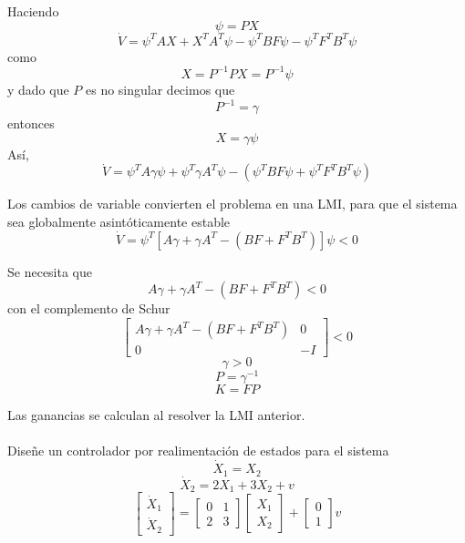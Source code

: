 \begin{flushright}
\end{flushright}

Haciendo
\[
  \psi=PX
\]
\[
  \dot{V}
  =\psi^{T}AX+X^{T}A^{T}\psi
  -\psi^{T}BF\psi-\psi^{T}F^{T}B^{T}\psi
\]
como
\[
  X=P^{-1}PX=P^{-1}\psi
\]
y dado que $P$ es no singular decimos que
\[
  P^{-1}=\gamma
\]
entonces
\[
  X=\gamma\psi
\]
Así,
\[
  \dot{V}
  =\psi^{T}A\gamma\psi+\psi^{T}\gamma A^{T}\psi
  -(\psi^{T}BF\psi+\psi^{T}F^{T}B^{T}\psi)
\]

Los cambios de variable convierten el problema en una LMI, para que el
sistema sea globalmente asintóticamente estable
\[
  \dot{V}
  =\psi^{T}\left[A\gamma+\gamma A^{T}-(BF+F^{T}B^{T})\right]\psi<0
\]

Se necesita que
\[
  A\gamma+\gamma A^{T}-(BF+F^{T}B^{T})<0
\]
con el complemento de Schur
\[
  \begin{bmatrix}
    A\gamma+\gamma A^{T}-(BF+F^{T}B^{T}) & 0\\
    0 & -I
  \end{bmatrix}<0
\]
\[
  \gamma>0
\]
\[
  P=\gamma^{-1}
\]
\[
  K=FP
\]

Las ganancias se calculan al resolver la LMI anterior.

\paragraph{}
Diseñe un controlador por realimentación de estados para el sistema
\[
  \dot{X}_1=X_2
\]
\[
  \dot{X}_2=2X_1+3X_2+v
\]
\[
  \begin{bmatrix}
    \dot{X}_1\\
    \dot{X}_2
  \end{bmatrix}
  =
  \begin{bmatrix}
    0 & 1\\
    2 & 3
  \end{bmatrix}
  \begin{bmatrix}
    X_1\\
    X_2
  \end{bmatrix}
  +
  \begin{bmatrix}
    0\\
    1
  \end{bmatrix}v
\]
